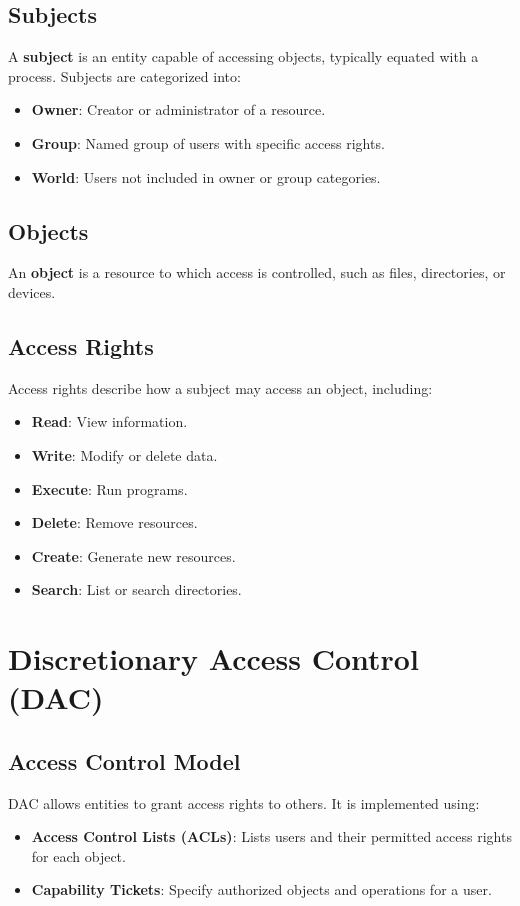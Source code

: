 \documentclass{article}
\begin{document}
\subsection{Subjects}
A \textbf{subject} is an entity capable of accessing objects, typically equated with a process. Subjects are categorized into:
\begin{itemize}
    \item \textbf{Owner}: Creator or administrator of a resource.
    \item \textbf{Group}: Named group of users with specific access rights.
    \item \textbf{World}: Users not included in owner or group categories.
\end{itemize}

\subsection{Objects}
An \textbf{object} is a resource to which access is controlled, such as files, directories, or devices.

\subsection{Access Rights}
Access rights describe how a subject may access an object, including:
\begin{itemize}
    \item \textbf{Read}: View information.
    \item \textbf{Write}: Modify or delete data.
    \item \textbf{Execute}: Run programs.
    \item \textbf{Delete}: Remove resources.
    \item \textbf{Create}: Generate new resources.
    \item \textbf{Search}: List or search directories.
\end{itemize}

\section{Discretionary Access Control (DAC)}
\subsection{Access Control Model}
DAC allows entities to grant access rights to others. It is implemented using:
\begin{itemize}
    \item \textbf{Access Control Lists (ACLs)}: Lists users and their permitted access rights for each object.
    \item \textbf{Capability Tickets}: Specify authorized objects and operations for a user.
\end{itemize}
\end{document}

